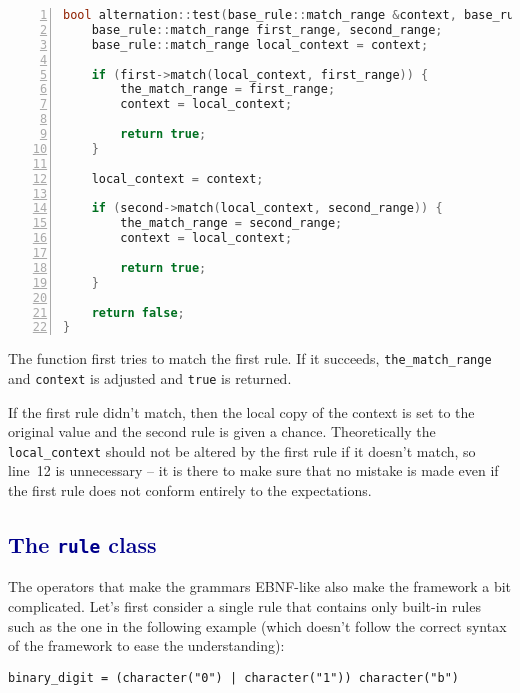 \documentclass[12pt]{article}
\newcommand{\usubsec}[2]{\subsection*{\textcolor{darkblue}{#1}}\label{subsec:#2}\addcontentsline{toc}{subsection}{#1}}
\begin{document}
\begin{center}
	\begin{minipage}[h]{0.8\textwidth}
		\begin{lstlisting}[language=C++, breaklines=true, numbers=left]
bool alternation::test(base_rule::match_range &context, base_rule::match_range &the_match_range) {
	base_rule::match_range first_range, second_range;
	base_rule::match_range local_context = context;

	if (first->match(local_context, first_range)) {
		the_match_range = first_range;
		context = local_context;

		return true;
	}
	
	local_context = context;

	if (second->match(local_context, second_range)) {
		the_match_range = second_range;
		context = local_context;

		return true;
	}
	
	return false;
}
		\end{lstlisting}
	\end{minipage}
\end{center}

The function first tries to match the first rule. If it succeeds, \texttt{the\_match\_range} and
\texttt{context} is adjusted and \texttt{true} is returned.

If the first rule didn't match, then the local copy of the context is set to the original value and the second
rule is given a chance. Theoretically the \texttt{local\_context} should not be altered by the first rule if
it doesn't match, so line~12 is unnecessary -- it is there to make sure that no mistake is made even if the
first rule does not conform entirely to the expectations.

\usubsec{The \texttt{rule} class}{rule}
The operators that make the grammars EBNF-like also make the framework a bit complicated. Let's first consider
a single rule that contains only built-in rules such as the one in the following example (which doesn't follow
the correct syntax of the framework to ease the understanding):

\begin{center}
	\begin{minipage}[h]{0.8\textwidth}
		\begin{lstlisting}[breaklines=true]
binary_digit = (character("0") | character("1")) character("b")
		\end{lstlisting}
	\end{minipage}
\end{center}
\end{document}
